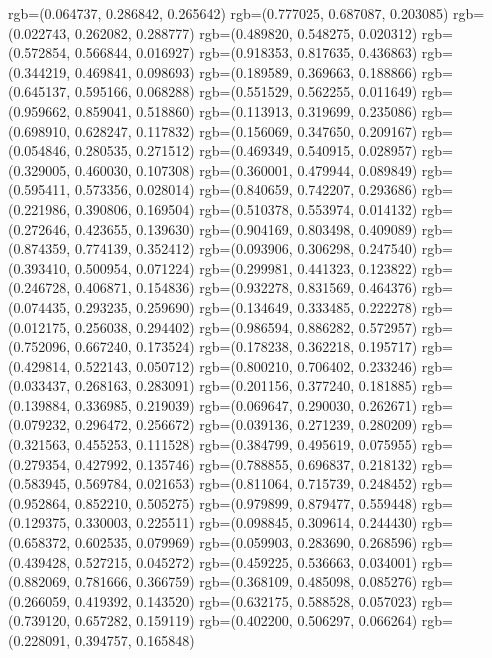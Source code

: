 {{{					rgb=(0.064737, 0.286842, 0.265642)
					rgb=(0.777025, 0.687087, 0.203085)
					rgb=(0.022743, 0.262082, 0.288777)
					rgb=(0.489820, 0.548275, 0.020312)
					rgb=(0.572854, 0.566844, 0.016927)
					rgb=(0.918353, 0.817635, 0.436863)
					rgb=(0.344219, 0.469841, 0.098693)
					rgb=(0.189589, 0.369663, 0.188866)
					rgb=(0.645137, 0.595166, 0.068288)
					rgb=(0.551529, 0.562255, 0.011649)
					rgb=(0.959662, 0.859041, 0.518860)
					rgb=(0.113913, 0.319699, 0.235086)
					rgb=(0.698910, 0.628247, 0.117832)
					rgb=(0.156069, 0.347650, 0.209167)
					rgb=(0.054846, 0.280535, 0.271512)
					rgb=(0.469349, 0.540915, 0.028957)
					rgb=(0.329005, 0.460030, 0.107308)
					rgb=(0.360001, 0.479944, 0.089849)
					rgb=(0.595411, 0.573356, 0.028014)
					rgb=(0.840659, 0.742207, 0.293686)
					rgb=(0.221986, 0.390806, 0.169504)
					rgb=(0.510378, 0.553974, 0.014132)
					rgb=(0.272646, 0.423655, 0.139630)
					rgb=(0.904169, 0.803498, 0.409089)
					rgb=(0.874359, 0.774139, 0.352412)
					rgb=(0.093906, 0.306298, 0.247540)
					rgb=(0.393410, 0.500954, 0.071224)
					rgb=(0.299981, 0.441323, 0.123822)
					rgb=(0.246728, 0.406871, 0.154836)
					rgb=(0.932278, 0.831569, 0.464376)
					rgb=(0.074435, 0.293235, 0.259690)
					rgb=(0.134649, 0.333485, 0.222278)
					rgb=(0.012175, 0.256038, 0.294402)
					rgb=(0.986594, 0.886282, 0.572957)
					rgb=(0.752096, 0.667240, 0.173524)
					rgb=(0.178238, 0.362218, 0.195717)
					rgb=(0.429814, 0.522143, 0.050712)
					rgb=(0.800210, 0.706402, 0.233246)
					rgb=(0.033437, 0.268163, 0.283091)
					rgb=(0.201156, 0.377240, 0.181885)
					rgb=(0.139884, 0.336985, 0.219039)
					rgb=(0.069647, 0.290030, 0.262671)
					rgb=(0.079232, 0.296472, 0.256672)
					rgb=(0.039136, 0.271239, 0.280209)
					rgb=(0.321563, 0.455253, 0.111528)
					rgb=(0.384799, 0.495619, 0.075955)
					rgb=(0.279354, 0.427992, 0.135746)
					rgb=(0.788855, 0.696837, 0.218132)
					rgb=(0.583945, 0.569784, 0.021653)
					rgb=(0.811064, 0.715739, 0.248452)
					rgb=(0.952864, 0.852210, 0.505275)
					rgb=(0.979899, 0.879477, 0.559448)
					rgb=(0.129375, 0.330003, 0.225511)
					rgb=(0.098845, 0.309614, 0.244430)
					rgb=(0.658372, 0.602535, 0.079969)
					rgb=(0.059903, 0.283690, 0.268596)
					rgb=(0.439428, 0.527215, 0.045272)
					rgb=(0.459225, 0.536663, 0.034001)
					rgb=(0.882069, 0.781666, 0.366759)
					rgb=(0.368109, 0.485098, 0.085276)
					rgb=(0.266059, 0.419392, 0.143520)
					rgb=(0.632175, 0.588528, 0.057023)
					rgb=(0.739120, 0.657282, 0.159119)
					rgb=(0.402200, 0.506297, 0.066264)
					rgb=(0.228091, 0.394757, 0.165848)
}}}
